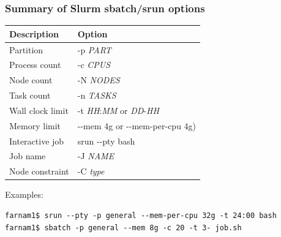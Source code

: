 \documentclass[10pt]{beamer}
\newcommand\smallfont{\fontsize{8pt}{7.2}\selectfont}
\begin{document}
\begin{frame}[fragile]
\frametitle{Summary of Slurm sbatch/srun options}
\begin{tabular}{|l|l|}
\hline
\textbf{Description} & \textbf{Option} \\
\hline
Partition & -p \textit{PART} \\
\hline
Process count & -c \textit{CPUS} \\
\hline
Node count & -N \textit{NODES} \\
\hline
Task count & -n \textit{TASKS} \\
\hline
Wall clock limit & -t \textit{HH}:\textit{MM} or \textit{DD}-\textit{HH}\\
\hline
Memory limit & -{}-mem 4g or -{}-mem-per-cpu 4g)\\
\hline
Interactive job & srun -{}-pty bash \\
\hline
Job name & -J \textit{NAME} \\
\hline
Node constraint & -C \textit{type} \\
\hline
\end{tabular}

\vskip10pt
Examples:
\smallfont
\begin{verbatim}
farnam1$ srun --pty -p general --mem-per-cpu 32g -t 24:00 bash 
farnam1$ sbatch -p general --mem 8g -c 20 -t 3- job.sh   
\end{verbatim}
\end{frame}
\end{document}
